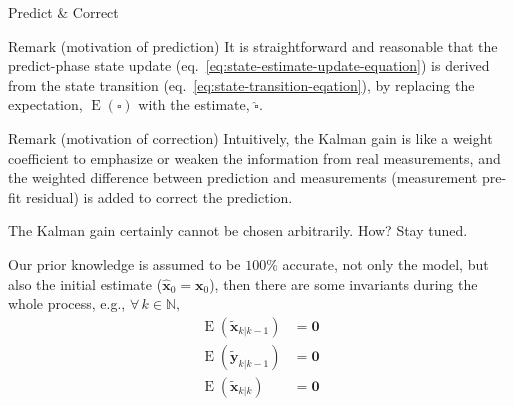 \documentclass[utf-8, 10pt, aspectratio=1610]{beamer}
\begin{document}
\begin{frame}[allowframebreaks]{Predict \& Correct}
	\framebreak
	\vspace*{\fill}
	\begin{block}{Remark (motivation of prediction)}
		It is straightforward and reasonable that the predict-phase state update (eq.~\ref{eq:state-estimate-update-equation}) is derived from the state transition (eq.~\ref{eq:state-transition-eqation}), by replacing the expectation, \(\operatorname{E}\left(\square\right)\) with the estimate, \(\hat{\square}\).
	\end{block}
	\begin{block}{Remark (motivation of correction)}
		Intuitively, the \textcolor{green_annotate_color}{Kalman gain} is like a weight coefficient to emphasize or weaken the information from real measurements, and the weighted difference between prediction and measurements (measurement pre-fit residual) is added to correct the prediction.
		\vspace{1em}
		\par The \textcolor{green_annotate_color}{Kalman gain} certainly cannot be chosen arbitrarily. How? Stay tuned.
	\end{block}
	\vspace*{\fill}

	\framebreak
	\vspace*{\fill}
	\begin{corollary}
		Our prior knowledge is assumed to be \(100\%\) accurate, not only the model, but also the initial estimate (\( \hat{\mathbf{x}}_0 = \mathbf{x}_0 \)), then there are some invariants during the whole process, e.g., \(\forall\,k\in \mathbb{N},\ \)
		\begin{align}
			\operatorname{E}\left(\tilde{\mathbf{x}}_{k\vert k-1}\right) & = \mathbf{0}                                         \\
			\operatorname{E}\left(\tilde{\mathbf{y}}_{k\vert k-1}\right) & = \mathbf{0}                                         \\
			\operatorname{E}\left(\tilde{\mathbf{x}}_{k\vert k}\right)   & = \mathbf{0} \label{eq:expectation-of-error-is-zero}
		\end{align}
	\end{corollary}
	\vspace*{\fill}


\end{frame}
\end{document}
